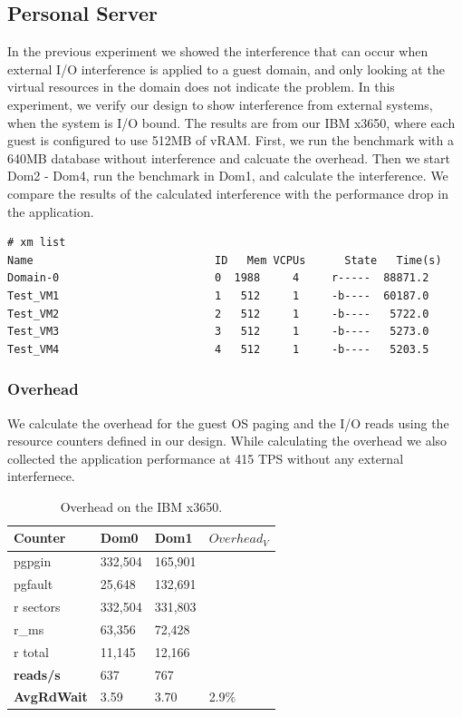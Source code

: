 \subsection{Personal Server}
In the previous experiment we showed the interference that can occur when external I/O interference is applied to a guest domain, and only looking at the virtual resources in the domain does not indicate the problem.  In this experiment, we verify our design to show interference from external systems, when the system is I/O bound.  The results are from our IBM x3650, where each guest is configured to use 512MB of vRAM.  First, we run the benchmark with a 640MB database without interference and calcuate the overhead.  Then we start Dom2 - Dom4, run the benchmark in Dom1, and calculate the interference.  We compare the results of the calculated interference with the performance drop in the application.

\begin{Verbatim}
# xm list
Name                            ID   Mem VCPUs      State   Time(s)
Domain-0                        0  1988     4     r-----  88871.2
Test_VM1                        1   512     1     -b----  60187.0
Test_VM2                        2   512     1     -b----   5722.0
Test_VM3                        3   512     1     -b----   5273.0
Test_VM4                        4   512     1     -b----   5203.5
\end{Verbatim}

\subsubsection{Overhead}
We calculate the overhead for the guest OS paging and the I/O reads using the resource counters defined in our design.  While calculating the overhead we also collected the application performance at 415 TPS without any external interfernece.

\begin{table}[h]
\begin{tabular}{ l l l p{5cm} }
  Counter     & Dom0 & Dom1 & $Overhead_V$ \\
  \hline
	pgpgin    & 332,504 & 165,901  &  \\
	pgfault   &  25,648 & 132,691  & \\
	r sectors & 332,504 & 331,803  &\\
	r\_ms     &  63,356 &  72,428  & \\
	r total   &  11,145 &  12,166  & \\
    \textbf{reads/s}    & 637 & 767 & \\
    \textbf{AvgRdWait}  & 3.59 & 3.70 & 2.9\% \\ 
  \hline
\end{tabular}
\caption{Overhead on the IBM x3650.}
\label{tab:OverheadSmall}
\end{table}

